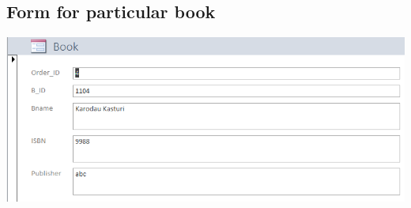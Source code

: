 \documentclass[17pt,a4paper,oneside,margin=1in]{article}
\begin{document}
\subsection{Form for particular book}
\includegraphics[width=1\textwidth]{./scrot/form.png}
\end{document}
